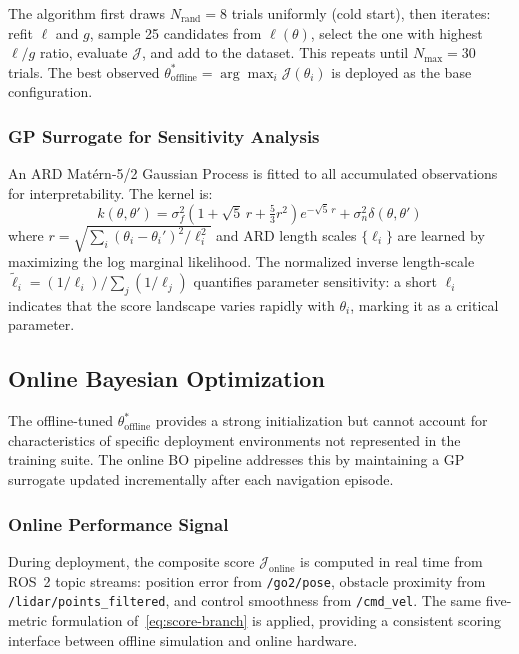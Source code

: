 \documentclass[conference]{IEEEtran}
\begin{document}
The algorithm first draws $N_{\text{rand}} = 8$ trials uniformly (cold start), then iterates: refit $\ell$ and $g$, sample 25 candidates from $\ell(\theta)$, select the one with highest $\ell/g$ ratio, evaluate $\mathcal{J}$, and add to the dataset. This repeats until $N_{\text{max}} = 30$ trials. The best observed $\theta^*_{\text{offline}} = \arg\max_{i} \mathcal{J}(\theta_i)$ is deployed as the base configuration.

\subsubsection{GP Surrogate for Sensitivity Analysis}

An ARD Matérn-5/2 Gaussian Process is fitted to all accumulated observations for interpretability. The kernel is:
\begin{equation}
	k(\theta, \theta') = \sigma_f^2 \!\left(1 + \sqrt{5}\,r + \tfrac{5}{3}r^2\right)\!e^{-\sqrt{5}\,r} + \sigma_n^2 \delta(\theta, \theta')
	\label{eq:gp-kernel}
\end{equation}
where $r = \sqrt{\sum_i (\theta_i - \theta_i')^2/\ell_i^2}$ and ARD length scales $\{\ell_i\}$ are learned by maximizing the log marginal likelihood. The normalized inverse length-scale $\tilde{\ell}_i = (1/\ell_i)/\sum_j(1/\ell_j)$ quantifies parameter sensitivity: a short $\ell_i$ indicates that the score landscape varies rapidly with $\theta_i$, marking it as a critical parameter.

\subsection{Online Bayesian Optimization}
\label{sec:online-bo}

The offline-tuned $\theta^*_{\text{offline}}$ provides a strong initialization but cannot account for characteristics of specific deployment environments not represented in the training suite. The online BO pipeline addresses this by maintaining a GP surrogate updated incrementally after each navigation episode.

\subsubsection{Online Performance Signal}

During deployment, the composite score $\mathcal{J}_{\text{online}}$ is computed in real time from ROS~2 topic streams: position error from \texttt{/go2/pose}, obstacle proximity from \texttt{/lidar/points\_filtered}, and control smoothness from \texttt{/cmd\_vel}. The same five-metric formulation of~\eqref{eq:score-branch} is applied, providing a consistent scoring interface between offline simulation and online hardware.
\end{document}
